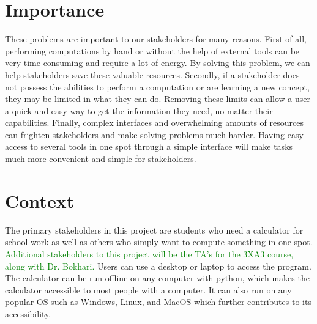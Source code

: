 \documentclass[12pt]{article}
\begin{document}
\section*{Importance}
These problems are important to our stakeholders for many reasons. First of all, performing computations by hand or without the help of external tools can be very time consuming and require a lot of energy. By solving this problem, we can help stakeholders save these valuable resources. Secondly, if a stakeholder does not possess the abilities to perform a computation or are learning a new concept, they may be limited in what they can do. Removing these limits can allow a user a quick and easy way to get the information they need, no matter their capabilities. Finally, complex interfaces and overwhelming amounts of resources can frighten stakeholders and make solving problems much harder. Having easy access to several tools in one spot through a simple interface will make tasks much more convenient and simple for stakeholders.

\section*{Context}
The primary stakeholders in this project are students who need a calculator for school work as well as others who simply want to compute something in one spot. \textcolor{green}{Additional stakeholders to this project will be the TA's for the 3XA3 course, along with Dr. Bokhari.} Users can use a desktop or laptop to access the program. The calculator can be run offline on any computer with python, which makes the calculator accessible to most people with a computer. It can also run on any popular OS such as Windows, Linux, and MacOS which further contributes to its accessibility.
\end{document}
